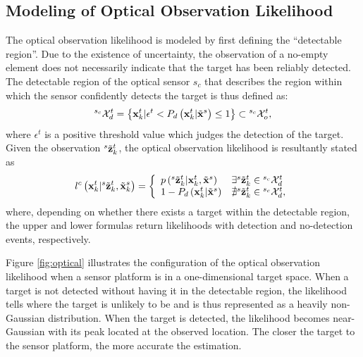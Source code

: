 \subsection{Modeling of Optical Observation Likelihood}
The optical observation likelihood is modeled by first defining the ``detectable region''. Due to the existence of uncertainty, the observation of a no-empty element does not necessarily indicate that the target has been reliably detected. The detectable region of the optical sensor $s_c$ that describes the region within which the sensor confidently detects the target is thus defined as:
\begin{eqnarray}
{}^{s_c}\mathcal{X}_d^{t} = \left \{ \mathbf{x}_{k}^{t} | \epsilon^{t} < P_d \left ( \mathbf{x}_{k}^{t}|\tilde {\mathbf{x}}^{s} \right ) \leq 1 \right \} \subset
{}^{s_c}\mathcal{X}_o^{t}, \nonumber
\end{eqnarray}
where $\epsilon^{t}$ is a positive threshold value which judges the detection of the target. Given the observation ${}^{s}\tilde {\mathbf{z}}_{k}^{t}$, the optical observation likelihood is resultantly stated as
\begin{equation}\label{eq:unif_sensor_model}
l^{c} \left ( \mathbf{x}_{k}^{t}|{}^{s}\tilde {\mathbf{z}}_{k}^{t},\tilde {\mathbf{x}}_{k}^{s} \right ) = \left\{
\begin{array}{ll}
\mbox{$ {p} \left ( {}^{s}\tilde {\mathbf{z}}_{k}^{t}|\mathbf{x}_{k}^{t},\tilde {\mathbf{x}}^{s} \right )$ } & \exists {}^{s}\tilde {\mathbf{z}}_{k}^{t} \in {}^{s_c}\mathcal{X}_d^{t} \\
1 -  P_d\left ( \mathbf{x}_{k}^{t}|\tilde {\mathbf{x}}^{s} \right ) & \nexists {}^{s}\tilde {\mathbf{z}}_{k}^{t} \in {}^{s_c}\mathcal{X}_d^{t},
\end{array}
\right.
\end{equation}
where, depending on whether there exists a target within the detectable region, the upper and lower formulas return likelihoods with detection and no-detection events, respectively.

Figure \ref{fig:optical} illustrates the configuration of the optical observation likelihood when a sensor platform is in a one-dimensional target space.  When a target is not detected without having it in the detectable region, the likelihood tells where the target is unlikely to be and is thus represented as a heavily non-Gaussian distribution. When the target is detected, the likelihood becomes near-Gaussian with its peak located at the observed location. The closer the target to the sensor platform, the more accurate the estimation. 

